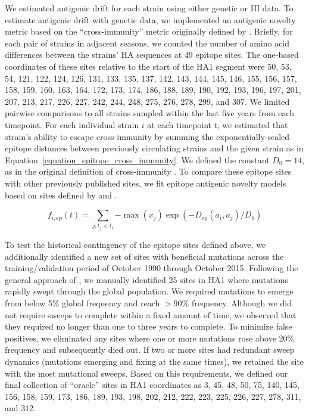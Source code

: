 We estimated antigenic drift for each strain using either genetic or HI data.
To estimate antigenic drift with genetic data, we implemented an antigenic novelty metric based on the ``cross-immunity'' metric originally defined by \cite{Luksza:2014hj}.
Briefly, for each pair of strains in adjacent seasons, we counted the number of amino acid differences between the strains' HA sequences at 49 epitope sites.
The one-based coordinates of these sites relative to the start of the HA1 segment were 50, 53, 54, 121, 122, 124, 126, 131, 133, 135, 137, 142, 143, 144, 145, 146, 155, 156, 157, 158, 159, 160, 163, 164, 172, 173, 174, 186, 188, 189, 190, 192, 193, 196, 197, 201, 207, 213, 217, 226, 227, 242, 244, 248, 275, 276, 278, 299, and 307.
We limited pairwise comparisons to all strains sampled within the last five years from each timepoint.
For each individual strain $i$ at each timepoint $t$, we estimated that strain's ability to escape cross-immunity by summing the exponentially-scaled epitope distances between previously circulating strains and the given strain as in Equation~\ref{equation_epitope_cross_immunity}.
We defined the constant $D_{0} = 14$, as in the original definition of cross-immunity \citep{Luksza:2014hj}.
To compare these epitope sites with other previously published sites, we fit epitope antigenic novelty models based on sites defined by \cite{Wolf:2006da} and \cite{Koel:2013jz}.

\begin{equation}
    f_{i,\mathrm{ep}}(t) = \sum_{j: t_{j} < t_{i}}{-\max(x_{j})\exp{(-D_{\mathrm{ep}}(a_{i}, a_{j}) / D_{0})}}
    \label{equation_epitope_cross_immunity}
\end{equation}

To test the historical contingency of the epitope sites defined above, we additionally identified a new set of sites with beneficial mutations across the training/validation period of October 1990 through October 2015.
Following the general approach of \cite{Shih:2007bd}, we manually identified 25 sites in HA1 where mutations rapidly swept through the global population.
We required mutations to emerge from below 5\% global frequency and reach $>$90\% frequency.
Although we did not require sweeps to complete within a fixed amount of time, we observed that they required no longer than one to three years to complete.
To minimize false positives, we eliminated any sites where one or more mutations rose above 20\% frequency and subsequently died out.
If two or more sites had redundant sweep dynamics (mutations emerging and fixing at the same times), we retained the site with the most mutational sweeps.
Based on this requirements, we defined our final collection of ``oracle'' sites in HA1 coordinates as 3, 45, 48, 50, 75, 140, 145, 156, 158, 159, 173, 186, 189, 193, 198, 202, 212, 222, 223, 225, 226, 227, 278, 311, and 312.

